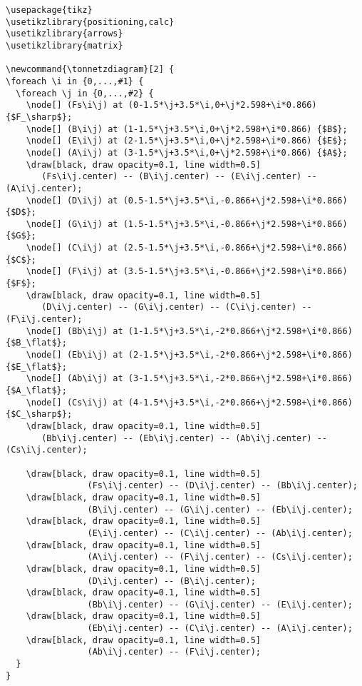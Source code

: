 \documentclass[10pt]{article}
\newcommand{\tonnetzdiagram}[2] {
	\foreach \i in {0,...,#1}
		\foreach \j in {0,...,#2} {
			\node[] (Fs\i\j) at (0-1.5*\j+3.5*\i,0+\j*2.598+\i*0.866) {$F_\sharp$};
			\node[] (B\i\j) at (1-1.5*\j+3.5*\i,0+\j*2.598+\i*0.866) {$B$};
			\node[] (E\i\j) at (2-1.5*\j+3.5*\i,0+\j*2.598+\i*0.866) {$E$};
			\node[] (A\i\j) at (3-1.5*\j+3.5*\i,0+\j*2.598+\i*0.866) {$A$};
			
			\draw[black, draw opacity=0.1, line width=0.5] (Fs\i\j.center) -- (B\i\j.center) -- (E\i\j.center) -- (A\i\j.center);
			
			\node[] (D\i\j) at (0.5-1.5*\j+3.5*\i,-0.866+\j*2.598+\i*0.866) {$D$};
			\node[] (G\i\j) at (1.5-1.5*\j+3.5*\i,-0.866+\j*2.598+\i*0.866) {$G$};
			\node[] (C\i\j) at (2.5-1.5*\j+3.5*\i,-0.866+\j*2.598+\i*0.866) {$C$};
			\node[] (F\i\j) at (3.5-1.5*\j+3.5*\i,-0.866+\j*2.598+\i*0.866) {$F$};
			
			\draw[black, draw opacity=0.1, line width=0.5] (D\i\j.center) -- (G\i\j.center) -- (C\i\j.center) -- (F\i\j.center);
			
			\node[] (Bb\i\j) at (1-1.5*\j+3.5*\i,-2*0.866+\j*2.598+\i*0.866) {$B_\flat$};
			\node[] (Eb\i\j) at (2-1.5*\j+3.5*\i,-2*0.866+\j*2.598+\i*0.866) {$E_\flat$};
			\node[] (Ab\i\j) at (3-1.5*\j+3.5*\i,-2*0.866+\j*2.598+\i*0.866) {$A_\flat$};
			\node[] (Cs\i\j) at (4-1.5*\j+3.5*\i,-2*0.866+\j*2.598+\i*0.866) {$C_\sharp$};
			
			\draw[black, draw opacity=0.1, line width=0.5] (Bb\i\j.center) -- (Eb\i\j.center) -- (Ab\i\j.center) -- (Cs\i\j.center);
			
			\draw[black, draw opacity=0.1, line width=0.5] (Fs\i\j.center) -- (D\i\j.center) -- (Bb\i\j.center);
			\draw[black, draw opacity=0.1, line width=0.5] (B\i\j.center) -- (G\i\j.center) -- (Eb\i\j.center);
			\draw[black, draw opacity=0.1, line width=0.5] (E\i\j.center) -- (C\i\j.center) -- (Ab\i\j.center);
			\draw[black, draw opacity=0.1, line width=0.5] (A\i\j.center) -- (F\i\j.center) -- (Cs\i\j.center);
			
			\draw[black, draw opacity=0.1, line width=0.5] (D\i\j.center) -- (B\i\j.center);
			\draw[black, draw opacity=0.1, line width=0.5] (Bb\i\j.center) -- (G\i\j.center) -- (E\i\j.center);
			\draw[black, draw opacity=0.1, line width=0.5] (Eb\i\j.center) -- (C\i\j.center) -- (A\i\j.center);
			\draw[black, draw opacity=0.1, line width=0.5] (Ab\i\j.center) -- (F\i\j.center);
			
			
	}
	
	\foreach \i in {0,...,\the\numexpr#1-1\relax} {
	    \foreach \j in {0,...,#2} {
	         \draw[black, draw opacity=0.1, line width=0.5] (Cs\i\j.center) -- (Bb\the\numexpr\i+1\relax\j.center);
	         \draw[black, draw opacity=0.1, line width=0.5] (F\i\j.center) -- (D\the\numexpr\i+1\relax\j.center);
	         \draw[black, draw opacity=0.1, line width=0.5] (A\i\j.center) -- (Fs\the\numexpr\i+1\relax\j.center);
	         
	         \draw[black, draw opacity=0.1, line width=0.5] (A\i\j.center) -- (D\the\numexpr\i+1\relax\j.center);
	         \draw[black, draw opacity=0.1, line width=0.5] (F\i\j.center) -- (Bb\the\numexpr\i+1\relax\j.center);
	     }
	 }
	 
	 \foreach \i in {0,...,#1} {
	 \foreach \j in {0,...,\the\numexpr#2-1\relax} {
	 	\draw[black, draw opacity=0.1, line width=0.5] (Fs\i\j.center) -- (Bb\i\the\numexpr\j+1\relax.center);
	         \draw[black, draw opacity=0.1, line width=0.5] (B\i\j.center) -- (Eb\i\the\numexpr\j+1\relax.center);
	         \draw[black, draw opacity=0.1, line width=0.5] (E\i\j.center) -- (Ab\i\the\numexpr\j+1\relax.center);
	         \draw[black, draw opacity=0.1, line width=0.5] (A\i\j.center) -- (Cs\i\the\numexpr\j+1\relax.center);
	 	\draw[black, draw opacity=0.1, line width=0.5] (Fs\i\j.center) -- (Eb\i\the\numexpr\j+1\relax.center);
		\draw[black, draw opacity=0.1, line width=0.5] (B\i\j.center) -- (Ab\i\the\numexpr\j+1\relax.center);
		\draw[black, draw opacity=0.1, line width=0.5] (E\i\j.center) -- (Cs\i\the\numexpr\j+1\relax.center);
	  }}
	 \foreach \i in {0,...,\the\numexpr#1-1\relax} {
	 \foreach \j in {1,...,#2} {
	 	\draw[black, draw opacity=0.1, line width=0.5] (Cs\i\j.center) -- (Fs\the\numexpr\i+1\relax\the\numexpr\j-1\relax.center);
	  }}
}
\begin{document}
\begin{verbatim}
\usepackage{tikz}
\usetikzlibrary{positioning,calc}
\usetikzlibrary{arrows}
\usetikzlibrary{matrix}

\newcommand{\tonnetzdiagram}[2] {
\foreach \i in {0,...,#1} {
  \foreach \j in {0,...,#2} {
    \node[] (Fs\i\j) at (0-1.5*\j+3.5*\i,0+\j*2.598+\i*0.866) {$F_\sharp$};
    \node[] (B\i\j) at (1-1.5*\j+3.5*\i,0+\j*2.598+\i*0.866) {$B$};
    \node[] (E\i\j) at (2-1.5*\j+3.5*\i,0+\j*2.598+\i*0.866) {$E$};
    \node[] (A\i\j) at (3-1.5*\j+3.5*\i,0+\j*2.598+\i*0.866) {$A$};	
    \draw[black, draw opacity=0.1, line width=0.5]
       (Fs\i\j.center) -- (B\i\j.center) -- (E\i\j.center) -- (A\i\j.center);		
    \node[] (D\i\j) at (0.5-1.5*\j+3.5*\i,-0.866+\j*2.598+\i*0.866) {$D$};
    \node[] (G\i\j) at (1.5-1.5*\j+3.5*\i,-0.866+\j*2.598+\i*0.866) {$G$};
    \node[] (C\i\j) at (2.5-1.5*\j+3.5*\i,-0.866+\j*2.598+\i*0.866) {$C$};
    \node[] (F\i\j) at (3.5-1.5*\j+3.5*\i,-0.866+\j*2.598+\i*0.866) {$F$};	
    \draw[black, draw opacity=0.1, line width=0.5]
       (D\i\j.center) -- (G\i\j.center) -- (C\i\j.center) -- (F\i\j.center);		
    \node[] (Bb\i\j) at (1-1.5*\j+3.5*\i,-2*0.866+\j*2.598+\i*0.866) {$B_\flat$};
    \node[] (Eb\i\j) at (2-1.5*\j+3.5*\i,-2*0.866+\j*2.598+\i*0.866) {$E_\flat$};
    \node[] (Ab\i\j) at (3-1.5*\j+3.5*\i,-2*0.866+\j*2.598+\i*0.866) {$A_\flat$};
    \node[] (Cs\i\j) at (4-1.5*\j+3.5*\i,-2*0.866+\j*2.598+\i*0.866) {$C_\sharp$};	
    \draw[black, draw opacity=0.1, line width=0.5]
       (Bb\i\j.center) -- (Eb\i\j.center) -- (Ab\i\j.center) -- (Cs\i\j.center);
			
    \draw[black, draw opacity=0.1, line width=0.5]
                (Fs\i\j.center) -- (D\i\j.center) -- (Bb\i\j.center);
    \draw[black, draw opacity=0.1, line width=0.5]
                (B\i\j.center) -- (G\i\j.center) -- (Eb\i\j.center);
    \draw[black, draw opacity=0.1, line width=0.5]
                (E\i\j.center) -- (C\i\j.center) -- (Ab\i\j.center);
    \draw[black, draw opacity=0.1, line width=0.5]
                (A\i\j.center) -- (F\i\j.center) -- (Cs\i\j.center);		
    \draw[black, draw opacity=0.1, line width=0.5]
                (D\i\j.center) -- (B\i\j.center);
    \draw[black, draw opacity=0.1, line width=0.5]
                (Bb\i\j.center) -- (G\i\j.center) -- (E\i\j.center);
    \draw[black, draw opacity=0.1, line width=0.5]
                (Eb\i\j.center) -- (C\i\j.center) -- (A\i\j.center);
    \draw[black, draw opacity=0.1, line width=0.5]
                (Ab\i\j.center) -- (F\i\j.center);			
  }
}
  

\end{verbatim}
\end{document}

